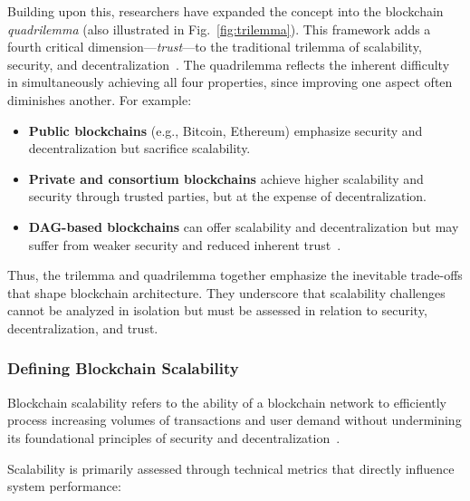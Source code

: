 Building upon this, researchers have expanded the concept into the blockchain \textit{quadrilemma} (also illustrated in Fig.~\ref{fig:trilemma}). This framework adds a fourth critical dimension—\textit{trust}—to the traditional trilemma of scalability, security, and decentralization~\cite{sanka2021systematic}. The quadrilemma reflects the inherent difficulty in simultaneously achieving all four properties, since improving one aspect often diminishes another. For example:

\begin{itemize}
    \item \textbf{Public blockchains} (e.g., Bitcoin, Ethereum) emphasize security and decentralization but sacrifice scalability.
    \item \textbf{Private and consortium blockchains} achieve higher scalability and security through trusted parties, but at the expense of decentralization.
    \item \textbf{DAG-based blockchains} can offer scalability and decentralization but may suffer from weaker security and reduced inherent trust~\cite{sanka2021systematic}.
\end{itemize}

Thus, the trilemma and quadrilemma together emphasize the inevitable trade-offs that shape blockchain architecture. They underscore that scalability challenges cannot be analyzed in isolation but must be assessed in relation to security, decentralization, and trust.

\vspace{12pt}
\subsubsection{Defining Blockchain Scalability}
\vspace{12pt}

Blockchain scalability refers to the ability of a blockchain network to efficiently process increasing volumes of transactions and user demand without undermining its foundational principles of security and decentralization~\cite{buterin2014ethereum,khan2021challenges}.

\vspace{12pt}
\vspace{12pt}

Scalability is primarily assessed through technical metrics that directly influence system performance:

